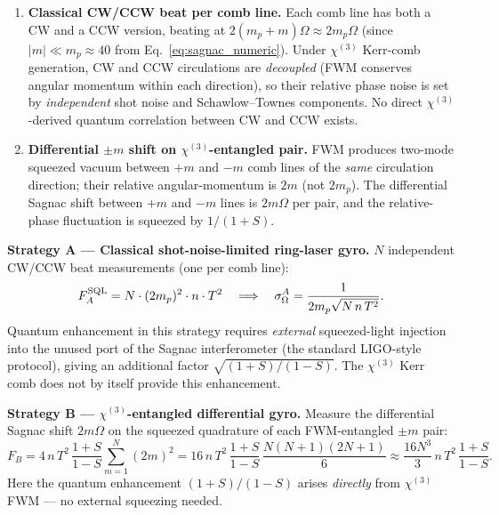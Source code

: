 \documentclass[11pt]{article}
\begin{document}
\begin{enumerate}\itemsep0em
\item \textbf{Classical CW/CCW beat per comb line.}
  Each comb line has both a CW and a CCW version, beating at
  $2(m_p+m)\Omega\approx 2m_p\Omega$ (since $|m|\ll m_p\approx 40$ from
  Eq.~\eqref{eq:sagnac_numeric}).  Under $\chi^{(3)}$ Kerr-comb
  generation, CW and CCW circulations are \emph{decoupled}
  (FWM conserves angular momentum within each direction), so their
  relative phase noise is set by \emph{independent} shot noise and
  Schawlow--Townes components.  No direct $\chi^{(3)}$-derived quantum
  correlation between CW and CCW exists.
\item \textbf{Differential $\pm m$ shift on $\chi^{(3)}$-entangled pair.}
  FWM produces two-mode squeezed vacuum between $+m$ and $-m$ comb
  lines of the \emph{same} circulation direction; their relative
  angular-momentum is $2m$ (not $2m_p$).  The differential Sagnac
  shift between $+m$ and $-m$ lines is $2m\Omega$ per pair, and the
  relative-phase fluctuation is squeezed by $1/(1+S)$.
\end{enumerate}

\textbf{Strategy A --- Classical shot-noise-limited ring-laser gyro.}
$N$ independent CW/CCW beat measurements (one per comb line):
\begin{equation}
  F_A^{\rm SQL} = N\cdot (2m_p)^2\cdot n\cdot T^2
  \quad\Longrightarrow\quad
  \sigma_\Omega^A = \frac{1}{2m_p\sqrt{N\,n\,T^2}}.
\end{equation}
Quantum enhancement in this strategy requires \emph{external}
squeezed-light injection into the unused port of the Sagnac interferometer
(the standard LIGO-style protocol), giving an additional factor
$\sqrt{(1+S)/(1-S)}$.  The $\chi^{(3)}$ Kerr comb does not by itself
provide this enhancement.

\textbf{Strategy B --- $\chi^{(3)}$-entangled differential gyro.}
Measure the differential Sagnac shift $2m\Omega$ on the squeezed
quadrature of each FWM-entangled $\pm m$ pair:
\begin{equation}
  F_B = 4\,n\,T^2\,\frac{1+S}{1-S}\sum_{m=1}^N (2m)^2
     = 16\,n\,T^2\,\frac{1+S}{1-S}\,\frac{N(N+1)(2N+1)}{6}
     \approx \frac{16 N^3}{3}\,n\,T^2\,\frac{1+S}{1-S}.
\end{equation}
Here the quantum enhancement $(1+S)/(1-S)$ arises \emph{directly}
from $\chi^{(3)}$ FWM --- no external squeezing needed.
\end{document}
